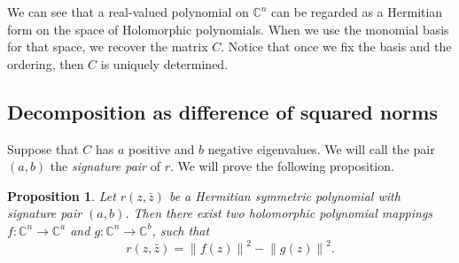 \documentclass[12pt,openany]{book}
\newcommand{\norm}[1]{\left\lVert {#1} \right\rVert}
\newcommand{\C}{{\mathbb{C}}}
\newcommand{\myindex}[1]{#1\index{#1}}
\theoremstyle{plain}
\newtheorem{prop}[thm]{Proposition}
\theoremstyle{remark}
\theoremstyle{definition}
\theoremstyle{exercise}
\theoremstyle{example}
\begin{document}
We can see that a real-valued 
polynomial on $\C^n$ can be regarded as a Hermitian form on the space of 
Holomorphic polynomials.  When we use the monomial basis for that space,
we recover the matrix $C$.  Notice that once we fix the basis and the
ordering, then $C$ is uniquely determined.

\subsection{Decomposition as difference of squared norms}

Suppose that $C$ has $a$ positive and $b$ negative eigenvalues.
We will call the pair $(a,b)$ the \emph{\myindex{signature pair}} of $r$.
We will prove the following proposition.

\begin{prop} \label{prop:sqnormsdecpoly}
Let $r(z,\bar{z})$ be a Hermitian symmetric polynomial with
signature pair $(a,b)$.
Then there exist
two holomorphic polynomial mappings
$f \colon \C^n \to \C^a$ and
$g \colon \C^n \to \C^b$, such that
\begin{equation}
r(z,\bar{z}) = \norm{f(z)}^2-\norm{g(z)}^2 .
\end{equation}
\end{prop}
\end{document}
